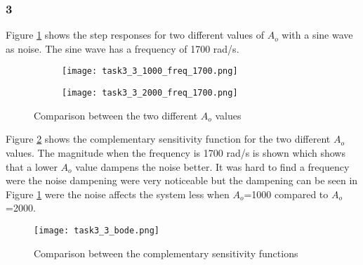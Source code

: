 \subsubsection*{3}

Figure \ref{fig:task3_3_1000_freq_1700} shows the step responses for two
different values of $A_o$ with a sine wave as noise. The sine wave has a
frequency of 1700 rad/s.

\begin{figure}[H]
    \centering
    \begin{subfigure}[b]{0.45\textwidth}
        \texttt{[image: task3\_3\_1000\_freq\_1700.png]}
    \end{subfigure}
    \begin{subfigure}[b]{0.45\textwidth}
        \texttt{[image: task3\_3\_2000\_freq\_1700.png]}
    \end{subfigure}
	\caption{Comparison between the two different $A_o$ values}
	\label{fig:task3_3_1000_freq_1700}
\end{figure}

Figure \ref{fig:task3_3_bode} shows the complementary sensitivity
function for the two different $A_o$ values. The magnitude when the
frequency is 1700 rad/s is shown which shows that a lower $A_o$ value
dampens the noise better. It was hard to find a frequency were the noise
dampening were very noticeable but the dampening can be seen in Figure
\ref{fig:task3_3_1000_freq_1700} were the noise affects the system less
when $A_o$=1000 compared to $A_o$=2000.

\begin{figure}[H]
	\begin{center}
	
		\texttt{[image: task3\_3\_bode.png]}
		\caption{Comparison between the complementary sensitivity functions}
		\label{fig:task3_3_bode}
	\end{center}
\end{figure}


%
